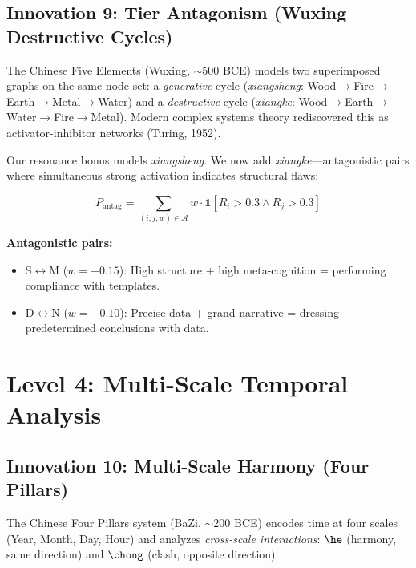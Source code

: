 \documentclass{article}
\begin{document}
\subsection{Innovation 9: Tier Antagonism (Wuxing Destructive Cycles)}

The Chinese Five Elements (Wuxing, $\sim$500 BCE) models two superimposed graphs on the same node set: a \emph{generative} cycle (\emph{xiangsheng}: Wood$\to$Fire$\to$Earth$\to$Metal$\to$Water) and a \emph{destructive} cycle (\emph{xiangke}: Wood$\to$Earth$\to$Water$\to$Fire$\to$Metal). Modern complex systems theory rediscovered this as activator-inhibitor networks (Turing, 1952).

Our resonance bonus models \emph{xiangsheng}. We now add \emph{xiangke}---antagonistic pairs where simultaneous strong activation indicates structural flaws:

\begin{equation}
    P_{\text{antag}} = \sum_{(i,j,w) \in \mathcal{A}} w \cdot \mathbb{1}[R_i > 0.3 \wedge R_j > 0.3]
\end{equation}

\textbf{Antagonistic pairs:}
\begin{itemize}
    \item S$\leftrightarrow$M ($w = -0.15$): High structure + high meta-cognition = performing compliance with templates.
    \item D$\leftrightarrow$N ($w = -0.10$): Precise data + grand narrative = dressing predetermined conclusions with data.
\end{itemize}

\section{Level 4: Multi-Scale Temporal Analysis}
\label{sec:multiscale}

\subsection{Innovation 10: Multi-Scale Harmony (Four Pillars)}

The Chinese Four Pillars system (BaZi, $\sim$200 BCE) encodes time at four scales (Year, Month, Day, Hour) and analyzes \emph{cross-scale interactions}: $\he$ (harmony, same direction) and $\chong$ (clash, opposite direction).
\end{document}
